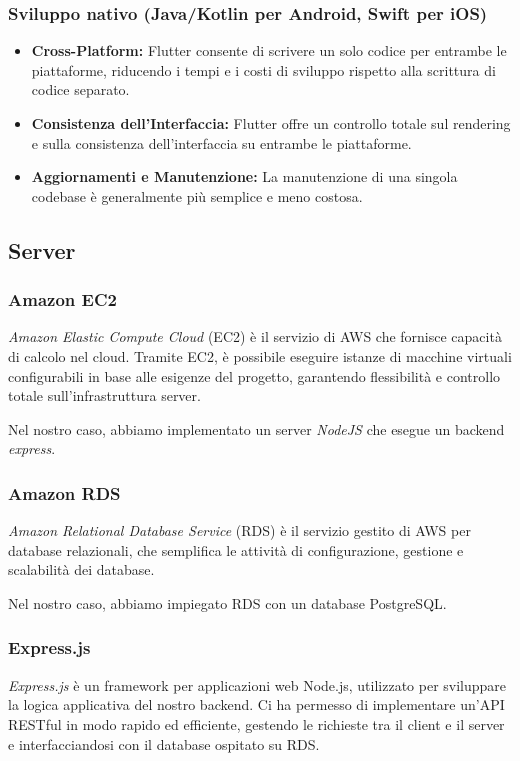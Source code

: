 \subsubsection{Sviluppo nativo (Java/Kotlin per Android, Swift per iOS)}
\begin{itemize}
	\item \textbf{Cross-Platform:} Flutter consente di scrivere un solo codice per entrambe le piattaforme, riducendo i tempi e i costi di sviluppo rispetto alla scrittura di codice separato.
	\item \textbf{Consistenza dell'Interfaccia:} Flutter offre un controllo totale sul rendering e sulla consistenza dell'interfaccia su entrambe le piattaforme.
	\item \textbf{Aggiornamenti e Manutenzione:} La manutenzione di una singola codebase è generalmente più semplice e meno costosa.
\end{itemize}

\subsection{Server}
\subsubsection{Amazon EC2}
\textit{Amazon Elastic Compute Cloud} (EC2) è il servizio di AWS che fornisce capacità di calcolo nel cloud.
Tramite EC2, è possibile eseguire istanze di macchine virtuali configurabili in base alle esigenze del progetto, garantendo flessibilità e controllo totale sull'infrastruttura server.

Nel nostro caso, abbiamo implementato un server \textit{NodeJS} che esegue un backend \textit{express}.

\subsubsection{Amazon RDS}
\textit{Amazon Relational Database Service} (RDS) è il servizio gestito di AWS per database relazionali, che semplifica le attività di configurazione, gestione e scalabilità dei database.

Nel nostro caso, abbiamo impiegato RDS con un database PostgreSQL.

\subsubsection{Express.js}
\textit{Express.js} è un framework per applicazioni web Node.js, utilizzato per sviluppare la logica applicativa del nostro backend. Ci ha permesso di implementare un'API RESTful in modo rapido ed efficiente, gestendo le richieste tra il client e il server e interfacciandosi con il database ospitato su RDS.

